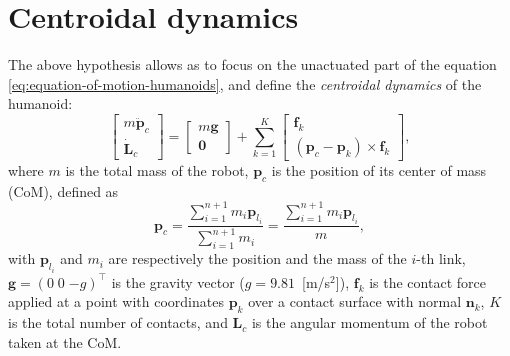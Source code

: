 \section{Centroidal dynamics}
The above hypothesis allows as to focus on the unactuated part of the equation
\eqref{eq:equation-of-motion-humanoids}, and define the
\textit{centroidal dynamics} \cite{Orin2013CentroidalDynamics} of the humanoid:
\begin{equation}
    \label{eq:centroidal-dynamics}
    \begin{bmatrix}
        m \ddot{\bm{p}}_c \\ \dot{\bm{L}}_c
    \end{bmatrix} =
    \begin{bmatrix}
        m \bm{g} \\ \bm{0}
    \end{bmatrix} +
    \sum_{k=1}^K
    \begin{bmatrix}
        \bm{f}_k \\ (\bm{p}_c - \bm{p}_k) \times \bm{f}_k
    \end{bmatrix},
\end{equation}
where $m$ is the total mass of the robot, $\bm{p}_c$ is the position of its
center of mass (CoM), defined as
\begin{equation*}
    \bm{p}_c =
    \frac{\sum_{i=1}^{n+1} m_i \bm{p}_{l_i}}{\sum_{i=1}^{n+1} m_i} =
    \frac{\sum_{i=1}^{n+1} m_i \bm{p}_{l_i}}{m},
\end{equation*}
with $\bm{p}_{l_i}$ and $m_i$ are respectively the position and the mass of the $i$-th link, 
$\bm{g} = (0 \; 0 \; {-g})^\top$ is the gravity vector ($g=9.81$~[m/s$^2$]), $\bm{f}_k$ is the contact force
applied at a point with coordinates $\bm{p}_k$ over a contact surface with normal
$\bm{n}_k$, $K$ is the total number of contacts, and $\bm{L}_c$ is the angular
momentum of the robot taken at the CoM.

